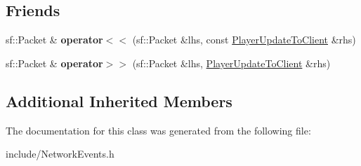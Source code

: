 \subsection*{Friends}
\begin{DoxyCompactItemize}
\item 
\hypertarget{class_player_update_to_client_a7c36f60e30110d0ed1f12279de182ccd}{sf\-::\-Packet \& {\bfseries operator$<$$<$} (sf\-::\-Packet \&lhs, const \hyperlink{class_player_update_to_client}{Player\-Update\-To\-Client} \&rhs)}\label{class_player_update_to_client_a7c36f60e30110d0ed1f12279de182ccd}

\item 
\hypertarget{class_player_update_to_client_a37c118890f7376a2c87e43bbd6e89e4d}{sf\-::\-Packet \& {\bfseries operator$>$$>$} (sf\-::\-Packet \&lhs, \hyperlink{class_player_update_to_client}{Player\-Update\-To\-Client} \&rhs)}\label{class_player_update_to_client_a37c118890f7376a2c87e43bbd6e89e4d}

\end{DoxyCompactItemize}
\subsection*{Additional Inherited Members}


The documentation for this class was generated from the following file\-:\begin{DoxyCompactItemize}
\item 
include/Network\-Events.\-h\end{DoxyCompactItemize}
